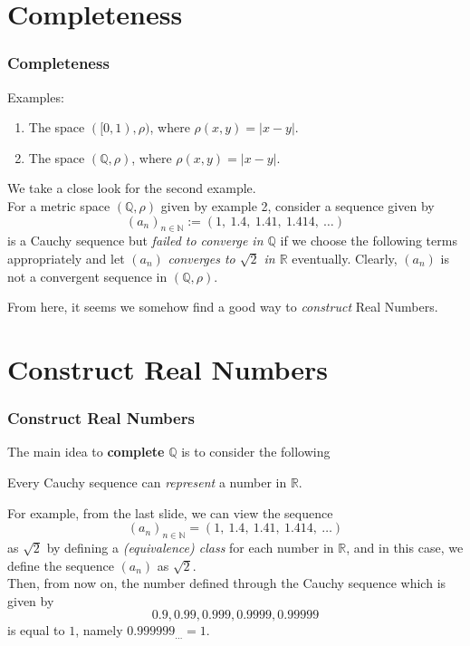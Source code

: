 \documentclass[12pt, t]{beamer}
\renewcommand{\emph}[1]{{\color{Turquoise3}\textsl{#1}}}
\begin{document}
\section{Completeness}
\begin{frame}
    \frametitle{Completeness}
Examples:
\begin{enumerate}
    \item The space $([0,1),\rho)$, where $\rho(x,y)=|x-y|$.
    \item The space $(\mathbb{Q},\rho)$, where $\rho(x,y)=|x-y|$.
\end{enumerate}
\vspace{1em}
We take a close look for the second example.\\

For a metric space $(\mathbb{Q},\rho)$ given by example 2, consider a sequence given by
\begin{equation*}
    (a_n)_{n\in\mathbb{N}}:=(1,\ 1.4,\ 1.41,\ 1.414,\ \dots)
\end{equation*}
is a Cauchy sequence but \emph{failed to converge in $\mathbb{Q}$} if we choose the following terms appropriately and let $(a_n)$ \emph{converges 
to $\sqrt{2}$ in $\mathbb{R}$} eventually. Clearly, $(a_n)$ is not a convergent sequence in $(\mathbb{Q},\rho)$.
\vspace{0,5em}

From here, it seems we somehow find a good way to \emph{construct} Real Numbers.
\end{frame}

\section{Construct Real Numbers}
\begin{frame}
    \frametitle{Construct Real Numbers}
The main idea to \textbf{complete} $\mathbb{Q}$ is to consider the following\\
\begin{center}
    Every Cauchy sequence can \emph{represent} a number in $\mathbb{R}$.
\end{center}

For example, from the last slide, we can view the sequence 
\begin{equation*}
    (a_n)_{n\in\mathbb{N}}=(1,\ 1.4,\ 1.41,\ 1.414,\ \dots)
\end{equation*}
as $\sqrt{2}$ by defining a \emph{(equivalence) class} for each number in $\mathbb{R}$, and in this case, we define the sequence $(a_n)$ as $\sqrt{2}$.\\
\vspace{0.5em}
Then, from now on, the number defined through the Cauchy sequence which is given by
\begin{equation*}
    0.9,0.99,0.999,0.9999,0.99999
\end{equation*}
is equal to $1$, namely $0.999999_{\dots}=1$.
\end{frame}
\end{document}
